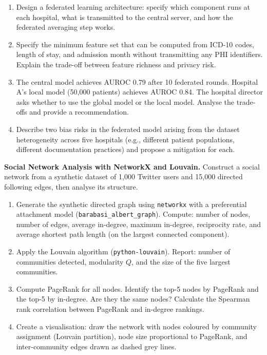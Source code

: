 \begin{enumerate}[label=(\alph*)]
  \item Design a federated learning architecture: specify which component
        runs at each hospital, what is transmitted to the central server,
        and how the federated averaging step works.
  \item Specify the minimum feature set that can be computed from ICD-10
        codes, length of stay, and admission month without transmitting
        any PHI identifiers. Explain the trade-off between feature richness
        and privacy risk.
  \item The central model achieves AUROC 0.79 after 10 federated rounds.
        Hospital A's local model (50{,}000 patients) achieves AUROC 0.84.
        The hospital director asks whether to use the global model or the
        local model. Analyse the trade-offs and provide a recommendation.
  \item Describe two bias risks in the federated model arising from
        the dataset heterogeneity across five hospitals (e.g., different
        patient populations, different documentation practices) and
        propose a mitigation for each.
\end{enumerate}


\pe \textbf{Social Network Analysis with NetworkX and Louvain.}
Construct a social network from a synthetic dataset of 1{,}000 Twitter
users and 15{,}000 directed following edges, then analyse its structure.
\begin{enumerate}[label=(\alph*)]
  \item Generate the synthetic directed graph using \texttt{networkx}
        with a preferential attachment model (\texttt{barabasi\_albert\_graph}).
        Compute: number of nodes, number of edges, average in-degree,
        maximum in-degree, reciprocity rate, and average shortest path
        length (on the largest connected component).
  \item Apply the Louvain algorithm (\texttt{python-louvain}). Report:
        number of communities detected, modularity $Q$, and the size
        of the five largest communities.
  \item Compute PageRank for all nodes. Identify the top-5 nodes by
        PageRank and the top-5 by in-degree. Are they the same nodes?
        Calculate the Spearman rank correlation between PageRank and
        in-degree rankings.
  \item Create a visualisation: draw the network with nodes coloured
        by community assignment (Louvain partition), node size
        proportional to PageRank, and inter-community edges drawn
        as dashed grey lines.
\end{enumerate}


